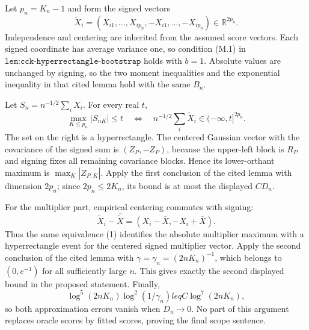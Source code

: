Let \(p_n=K_n-1\) and form the signed vectors
\[
 \widetilde X_i=(X_{i1},\ldots,X_{ip_n},-X_{i1},\ldots,-X_{ip_n})\in\mathbb R^{2p_n}.
\]
Independence and centering are inherited from the assumed score vectors.  Each signed coordinate has average variance one, so condition (M.1) in \(\texttt{lem:cck-hyperrectangle-bootstrap}\) holds with \(b=1\).  Absolute values are unchanged by signing, so the two moment inequalities and the exponential inequality in that cited lemma hold with the same \(B_n\).

Let \(S_n=n^{-1/2}\sum_iX_i\).  For every real \(t\),
\[
 \max_{K\leq p_n}|S_{nK}|\leq t
 \quad\Longleftrightarrow\quad
 n^{-1/2}\sum_i\widetilde X_i\in(-\infty,t]^{2p_n}.                            \tag{1}
\]
The set on the right is a hyperrectangle.  The centered Gaussian vector with the covariance of the signed sum is \((Z_P,-Z_P)\), because the upper-left block is \(R_P\) and signing fixes all remaining covariance blocks.  Hence its lower-orthant maximum is \(\max_K|Z_{P,K}|\).  Apply the first conclusion of the cited lemma with dimension \(2p_n\); since \(2p_n\leq2K_n\), its bound is at most the displayed \(CD_n\).

For the multiplier part, empirical centering commutes with signing:
\[
 \widetilde X_i-\overline{\widetilde X}
 =(X_i-\overline X,-X_i+\overline X).
\]
Thus the same equivalence (1) identifies the absolute multiplier maximum with a hyperrectangle event for the centered signed multiplier vector.  Apply the second conclusion of the cited lemma with \(\gamma=\gamma_n=(2nK_n)^{-1}\), which belongs to \((0,e^{-1})\) for all sufficiently large \(n\).  This gives exactly the second displayed bound in the proposed statement.  Finally,
\[
 \log^5(2nK_n)\log^2(1/\gamma_n)leq C\log^7(2nK_n),
\]
so both approximation errors vanish when \(D_n\to0\).  No part of this argument replaces oracle scores by fitted scores, proving the final scope sentence.